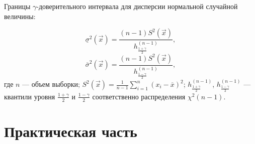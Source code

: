 \documentclass[12pt]{report}
\begin{document}
Границы $\gamma$-доверительного интервала для дисперсии нормальной случайной величины:

\begin{equation}
	\underline{\sigma}^2(\vec x) = \frac{(n - 1)S^2(\vec x)}{h^{(n - 1)}_{\frac{1 + \gamma}{2}}},
\end{equation}
\begin{equation}
	\overline{\sigma}^2(\vec x) = \frac{(n - 1)S^2(\vec x)}{h^{(n - 1)}_{\frac{1 - \gamma}{2}}},
\end{equation}
где $n$ --- объем выборки; $S^2(\vec x) = \frac{1}{n-1} \sum_{i=1}^n (x_i - \overline x)^2$; $h^{(n - 1)}_{\frac{1 + \gamma}{2}}$, $h^{(n - 1)}_{\frac{1 - \gamma}{2}}$ --- квантили уровня $\frac{1 + \gamma}{2}$ и $\frac{1 - \gamma}{2}$ соответственно распределения $\chi^2(n - 1)$.

\chapter{Практическая часть}
\end{document}
